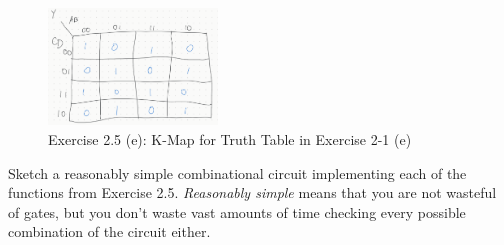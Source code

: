 \documentclass[12pt]{article}
\newenvironment{ex}[2][Exercise]{\begin{trivlist}
		\item[\hskip \labelsep {\bfseries #1}\hskip \labelsep {\bfseries #2.}]}{\end{trivlist}}
\newenvironment{sol}[1][Solution]{\begin{trivlist}
		\item[\hskip \labelsep {\bfseries #1:}]}{\end{trivlist}}
\begin{document}
\begin{sol}
\begin{enumerate}[label=(\alph*)]
		\begin{figure}
			\centering
			\includegraphics[width=0.4\textwidth]{02-05e-k-map}
			\caption{Exercise 2.5 (e): K-Map for Truth Table in Exercise 2-1 (e)}
			\label{02-05e}
		\end{figure}
	\end{enumerate}
\end{sol}

\begin{ex}{2.7}
	Sketch a reasonably simple combinational circuit implementing each of the functions from Exercise 2.5. \emph{Reasonably simple} means that you are not wasteful of gates, but you don't waste vast amounts of time checking every possible combination of the circuit either.
\end{ex}
\end{document}

